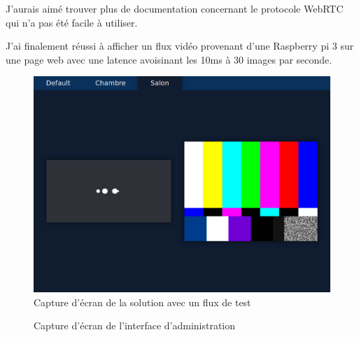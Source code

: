\documentclass[12pt, a4paper]{report}
\begin{document}
J'aurais aimé trouver plus de documentation concernant le protocole WebRTC qui n'a pas été facile à utiliser.\newline

J'ai finalement réussi à afficher un flux vidéo provenant d'une Raspberry pi 3 sur une page web avec une latence avoisinant les 10ms à 30 images par seconde.\newline
\begin{figure}[H]
    \centering
    \includegraphics[width=.8\textwidth]{omniroom.png}
    \caption{Capture d'écran de la solution avec un flux de test}
\end{figure}
\begin{figure}[H]
    \centering
    \caption{Capture d'écran de l'interface d'administration}
\end{figure}
\listoffigures
\makeutbmbackcover{}
\end{document}
